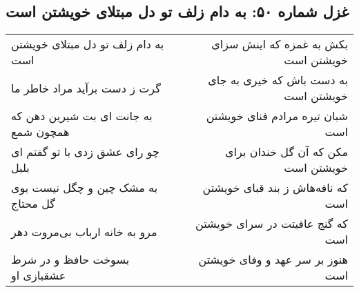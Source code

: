 \begin{center}
\section*{غزل شماره ۵۰: به دام زلف تو دل مبتلای خویشتن است}
\label{sec:sh050}
\begin{longtable}{l p{0.5cm} r}
به دام زلف تو دل مبتلای خویشتن است
&&
بکش به غمزه که اینش سزای خویشتن است
\\
گرت ز دست برآید مراد خاطر ما
&&
به دست باش که خیری به جای خویشتن است
\\
به جانت ای بت شیرین دهن که همچون شمع
&&
شبان تیره مرادم فنای خویشتن است
\\
چو رای عشق زدی با تو گفتم ای بلبل
&&
مکن که آن گل خندان برای خویشتن است
\\
به مشک چین و چگل نیست بوی گل محتاج
&&
که نافه‌هاش ز بند قبای خویشتن است
\\
مرو به خانه ارباب بی‌مروت دهر
&&
که گنج عافیتت در سرای خویشتن است
\\
بسوخت حافظ و در شرط عشقبازی او
&&
هنوز بر سر عهد و وفای خویشتن است
\\
\end{longtable}
\end{center}
